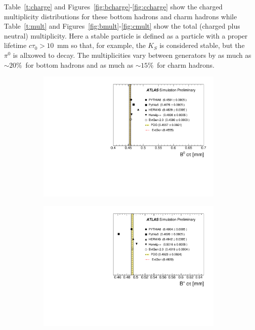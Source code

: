 Table~\ref{t:charge} and Figures~\ref{fig:bcharge}-\ref{fig:ccharge}
show the charged multiplicity distributions for these bottom hadrons and charm hadrons while
Table~\ref{t:mult} and Figures~\ref{fig:bmult}-\ref{fig:cmult} show the total (charged plus neutral) multiplicity.
Here a stable particle is defined
as a particle with a proper lifetime $c\tau_{0}>10$~mm so that, for example, the
$K_S$ is considered stable, but the $\pi^0$ is allxowed to decay.
The multiplicities vary between generators by as much as $\sim 20$\%\ for bottom
hadrons and as much as $\sim 15$\%\ for charm hadrons.

\begin{figure}
\centering
\begin{subfigure}[]{0.45\textwidth}
\includegraphics[width=\textwidth]{evtgen/figures/EvtGen/h_B0_life.pdf}
\end{subfigure}
\begin{subfigure}[]{0.45\textwidth}
\includegraphics[width=\textwidth]{evtgen/figures/EvtGen/h_B_life.pdf}

\end{subfigure}
\end{figure}
